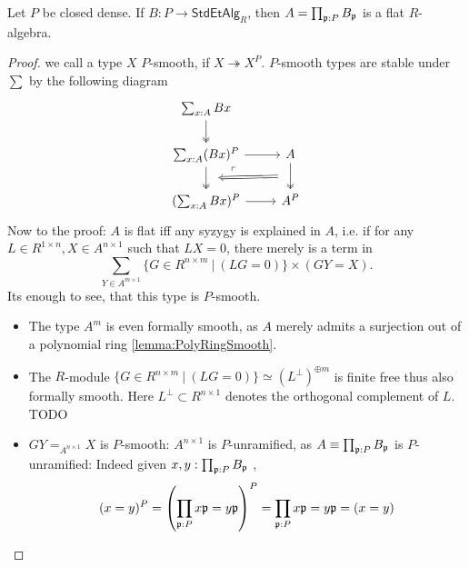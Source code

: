 \begin{lemma}{\label{lemma:FlatForStdEtAlg}}
	Let $P$ be closed dense. If $B : P \to \mathsf{StdEtAlg}_R$, then $A = \prod_{\mathfrak{p} : P} B_{\mathfrak{p}}$ is a flat $R$-algebra.
\end{lemma}
\begin{proof}
	 we call a type $X$ $P$-smooth, if $X \twoheadrightarrow X^P$. $P$-smooth types are stable under $\sum$ by the following diagram
	\[\begin{tikzcd}
		{\sum_{x : A} B x} \\
		{\sum_{x :A} (Bx) ^P} & A \\
		{(\sum_{x :A} Bx)^P} & {A^P}
		\arrow[two heads, from=1-1, to=2-1]
		\arrow[from=2-1, to=2-2]
		\arrow[""{name=0, anchor=center, inner sep=0}, two heads, from=2-1, to=3-1]
		\arrow["\ulcorner"{anchor=center, pos=0.125}, draw=none, from=2-1, to=3-2]
		\arrow[""{name=1, anchor=center, inner sep=0}, two heads, from=2-2, to=3-2]
		\arrow[from=3-1, to=3-2]
		\arrow[shorten <=9pt, shorten >=9pt, Rightarrow, from=1, to=0]
	\end{tikzcd}\]
	Now to the proof:
	$A$ is flat iff any syzygy is explained in $A$, i.e. if for any $L \in R^{1 \times n} , X \in A^{n \times 1}$ such that $L X = 0$, there merely is a term in
	\[
	\sum_{Y \in A^{m\times 1}} \{ G \in R^{n \times m} \ | \ (L G = 0) \} \times (G Y = X).\]	
	Its enough to see, that this type is $P$-smooth.
	\begin{itemize}
		\item 	The type $A^m$ is even formally smooth, as $A$ merely admits a surjection out of a polynomial ring \ref{lemma:PolyRingSmooth}. \\
		\item The $R$-module $\{ G \in R^{n \times m} \ | \ (L G = 0) \} \simeq (L^\bot)^{\oplus m}$ is finite free thus also formally smooth. Here $L^\bot \subset R^{n \times 1}$ denotes the orthogonal complement of $L$. TODO
		\item $G Y =_{A^{n \times 1}} X$ is $P$-smooth: $A^{n \times 1}$ is $P$-unramified, as $A \equiv  \prod_{\mathfrak{p} : P} B_{\mathfrak{p}}$ is $P$-unramified: Indeed given $x , y :  \prod_{\mathfrak{p} : P} B_{\mathfrak{p}}$ , 
		\[(x = y)^P = \left(\prod_{\mathfrak{p} : P} x \mathfrak{p} = y \mathfrak{p} \right)^P = \prod_{\mathfrak{p} : P} x \mathfrak{p} = y \mathfrak{p} = (x = y)\]
	\end{itemize}
	

	
\end{proof}
